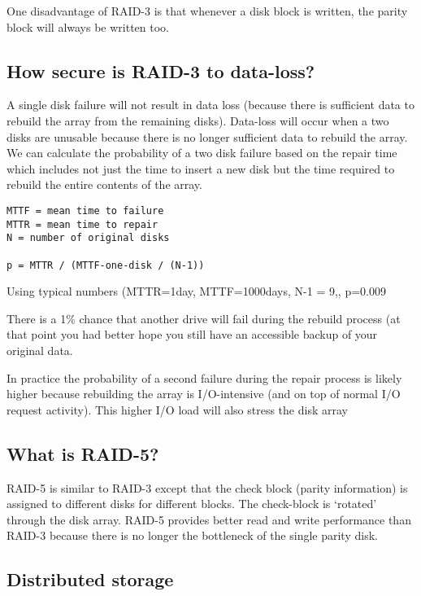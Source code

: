 One disadvantage of RAID-3 is that whenever a disk block is written, the
parity block will always be written too.

\subsection{How secure is RAID-3 to
data-loss?}\label{how-secure-is-raid-3-to-data-loss}

A single disk failure will not result in data loss (because there is
sufficient data to rebuild the array from the remaining disks).
Data-loss will occur when a two disks are unusable because there is no
longer sufficient data to rebuild the array. We can calculate the
probability of a two disk failure based on the repair time which
includes not just the time to insert a new disk but the time required to
rebuild the entire contents of the array.

\begin{verbatim}
MTTF = mean time to failure
MTTR = mean time to repair
N = number of original disks

p = MTTR / (MTTF-one-disk / (N-1))
\end{verbatim}

Using typical numbers (MTTR=1day, MTTF=1000days, N-1 = 9,, p=0.009

There is a 1\% chance that another drive will fail during the rebuild
process (at that point you had better hope you still have an accessible
backup of your original data.

In practice the probability of a second failure during the repair
process is likely higher because rebuilding the array is I/O-intensive
(and on top of normal I/O request activity). This higher I/O load will
also stress the disk array

\subsection{What is RAID-5?}\label{what-is-raid-5}

RAID-5 is similar to RAID-3 except that the check block (parity
information) is assigned to different disks for different blocks. The
check-block is `rotated' through the disk array. RAID-5 provides better
read and write performance than RAID-3 because there is no longer the
bottleneck of the single parity disk.

\subsection{Distributed storage}\label{distributed-storage}

